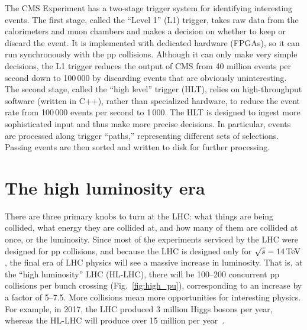 The CMS Experiment has a two-stage trigger system for identifying interesting events. 
The first stage, called the ``Level 1'' (L1) trigger, takes raw data from the calorimeters and muon chambers and makes a decision on whether to keep or discard the event. 
It is implemented with dedicated hardware (FPGAs), so it can run synchronously with the pp collisions. 
Although it can only make very simple decisions, the L1 trigger reduces the output of CMS from 40 million events per second down to 100\,000 by discarding events that are obviously uninteresting. 
The second stage, called the ``high level'' trigger (HLT), relies on high-throughput software (written in C++), rather than specialized hardware, to reduce the event rate from 100\,000 events per second to 1\,000. 
The HLT is designed to ingest more sophisticated input and thus make more precise decisions. 
In particular, events are processed along trigger ``paths,'' representing different sets of selections. 
Passing events are then sorted and written to disk for further processing. 

\section{The high luminosity era}
There are three primary knobs to turn at the LHC: what things are being collided, what energy they are collided at, and how many of them are collided at once, or the luminosity. 
Since most of the experiments serviced by the LHC were designed for pp collisions, and because the LHC is designed only for $\sqrt{s} = 14\,\text{Te\hspace{-.08em}V}$, the final era of LHC physics will see a massive increase in luminosity. 
That is, at the ``high luminosity'' LHC (HL-LHC), there will be 100--200 concurrent pp collisions per bunch crossing (Fig.~\ref{fig:high_pu}), corresponding to an increase by a factor of 5--7.5.
More collisions mean more opportunities for interesting physics. 
For example, in 2017, the LHC produced 3 million Higgs bosons per year, whereas the HL-LHC will produce over 15 million per year~\cite{HighLumiWebFacts}. 


